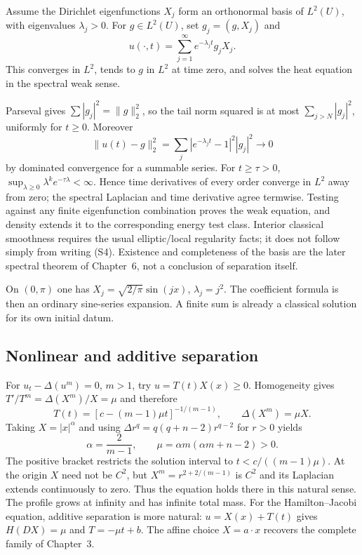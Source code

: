 \begin{theorem}
Assume the Dirichlet eigenfunctions $X_j$ form an orthonormal basis
of $L^2(U)$, with eigenvalues $\lambda_j>0$.
For $g\in L^2(U)$, set $g_j=(g,X_j)$ and
\[
 u(\cdot,t)=\sum_{j=1}^\infty e^{-\lambda_jt}g_jX_j .
 \tag{S4}
\]
This converges in $L^2$, tends to $g$ in $L^2$ at time zero, and
solves the heat equation in the spectral weak sense.
\end{theorem}
\begin{expandedproof}
Parseval gives $\sum|g_j|^2=\|g\|_2^2$, so the tail norm squared is
at most $\sum_{j>N}|g_j|^2$, uniformly for $t\geq0$.
Moreover
\[
 \|u(t)-g\|_2^2
 =\sum_j|e^{-\lambda_jt}-1|^2|g_j|^2\longrightarrow0
\]
by dominated convergence for a summable series.
For $t\geq\tau>0$, $\sup_{\lambda\geq0}\lambda^ke^{-\tau\lambda}<\infty$.
Hence time derivatives of every order converge in $L^2$ away from zero;
the spectral Laplacian and time derivative agree termwise.
Testing against any finite eigenfunction combination proves the weak
equation, and density extends it to the corresponding energy test class.
Interior classical smoothness requires the usual elliptic/local
regularity facts; it does not follow simply from writing (S4).
Existence and completeness of the basis are the later spectral theorem
of Chapter~6, not a conclusion of separation itself.
\end{expandedproof}
On $(0,\pi)$ one has $X_j=\sqrt{2/\pi}\sin(jx)$, $\lambda_j=j^2$.
The coefficient formula is then an ordinary sine-series expansion.
A finite sum is already a classical solution for its own initial datum.

\Needspace{35mm}
\subsection{Nonlinear and additive separation}
For $u_t-\Delta(u^m)=0$, $m>1$, try $u=T(t)X(x)\geq0$.
Homogeneity gives $T'/T^m=\Delta(X^m)/X=\mu$ and therefore
\[
 T(t)=[c-(m-1)\mu t]^{-1/(m-1)},\qquad \Delta(X^m)=\mu X .
\]
Taking $X=|x|^\alpha$ and using
$\Delta r^q=q(q+n-2)r^{q-2}$ for $r>0$ yields
\[
 \alpha=\frac2{m-1},\qquad
 \mu=\alpha m(\alpha m+n-2)>0 .
\]
The positive bracket restricts the solution interval to
$t<c/((m-1)\mu)$. At the origin $X$ need not be $C^2$,
but $X^m=r^{2+2/(m-1)}$ is $C^2$ and its Laplacian extends
continuously to zero. Thus the equation holds there in this natural
sense. The profile grows at infinity and has infinite total mass.
\Needspace{45mm}
For the Hamilton--Jacobi equation, additive separation is more natural:
$u=X(x)+T(t)$ gives $H(DX)=\mu$ and $T=-\mu t+b$.
The affine choice $X=a\cdot x$ recovers the complete family of Chapter~3.

